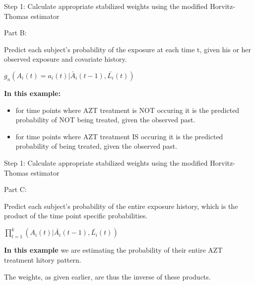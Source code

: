 \documentclass[ignorenonframetext,]{beamer}
\providecommand{\tightlist}{%
  \setlength{\itemsep}{0pt}\setlength{\parskip}{0pt}}
\begin{document}
\begin{frame}{Step 1: Calculate appropriate stabilized weights using the
modified Horvitz-Thomas estimator}

\begin{block}{Part B:}

Predict each subject's probability of the exposure at each time t, given
his or her observed exposure and covariate history.

\vspace{6 mm}

\(g_n(A_i(t)=a_i(t) | \bar{A}_i(t-1), \bar{L_i}(t))\)

\vspace{6mm}

\textbf{In this example:}

\begin{itemize}
\tightlist
\item
  for time points where AZT treatment is NOT occuring it is the
  predicted probability of NOT being treated, given the observed past.
\item
  for time points where AZT treatment IS occuring it is the predicted
  probability of being treated, given the observed past.
\end{itemize}

\end{block}

\end{frame}

\begin{frame}{Step 1: Calculate appropriate stabilized weights using the
modified Horvitz-Thomas estimator}

\begin{block}{Part C:}

Predict each subject's probability of the entire exposure history, which
is the product of the time point specific probabilities.

\vspace{6mm}

\(\prod_{t=1}^k(A_i(t) | \bar{A_i}(t-1),\bar{L_i}(t))\)

\vspace{6mm}

\textbf{In this example} we are estimating the probability of their
entire AZT treatment hitory pattern.

\vspace{4mm}

The weights, as given earlier, are thus the inverse of these products.

\end{block}

\end{frame}
\end{document}
